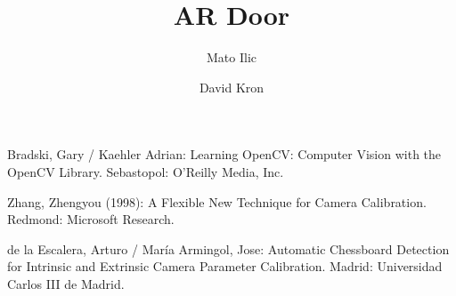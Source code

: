 \documentclass{llncs}
\begin{document}
%
\pagestyle{headings}  %
%
\title{AR Door}
%
%
\author{Mato Ilic \and David Kron}
%
%
%

\maketitle              %

\tableofcontents
\newpage


\newpage


\newpage


\newpage


\newpage

%
%
%
\newpage
\begin{thebibliography}{5}

Bradski, Gary / Kaehler Adrian:
Learning OpenCV: Computer Vision with the OpenCV Library.
Sebastopol: O'Reilly Media, Inc.

Zhang, Zhengyou (1998): A Flexible New Technique for Camera Calibration. 
Redmond: Microsoft Research.

de la Escalera, Arturo / María Armingol, Jose: Automatic Chessboard Detection for Intrinsic and Extrinsic Camera Parameter Calibration. 
Madrid: Universidad Carlos III de Madrid.

\end{thebibliography}
\end{document}
